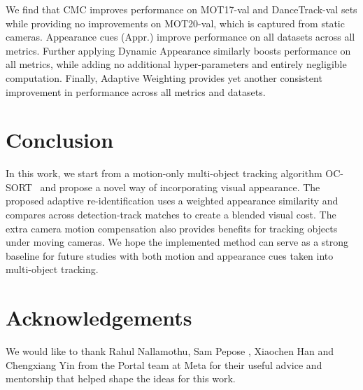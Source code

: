 \documentclass{article}
\begin{document}
We find that CMC improves performance on MOT17-val and DanceTrack-val sets while providing no improvements on MOT20-val, which is captured from static cameras. Appearance cues (Appr.) improve performance on all datasets across all metrics. Further applying Dynamic Appearance similarly boosts performance on all metrics, while adding no additional hyper-parameters and entirely negligible computation.  Finally, Adaptive Weighting provides yet another consistent improvement in performance across all metrics and datasets.  



\section{Conclusion}
\vspace{-0.2cm}
In this work, we start from a motion-only multi-object tracking algorithm OC-SORT~\cite{cao2022observation} and propose a novel way of incorporating visual appearance. The proposed adaptive re-identification uses a weighted appearance similarity and compares across detection-track matches to create a blended visual cost. The extra camera motion compensation also provides benefits for tracking objects under moving cameras. We hope the implemented method can serve as a strong baseline for future studies with both motion and appearance cues taken into multi-object tracking.

\section{Acknowledgements}
\vspace{-0.2cm}
We would like to thank Rahul Nallamothu, Sam Pepose , Xiaochen Han and Chengxiang Yin from the Portal team at Meta for their useful advice and mentorship that helped shape the ideas for this work. 




\end{document}
